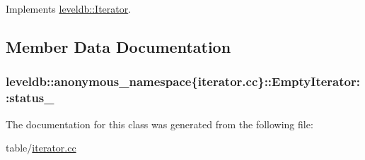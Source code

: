 Implements \hyperlink{classleveldb_1_1_iterator_a613ac2e965518aad7a064c64c72bcf7c}{leveldb\+::\+Iterator}.



\subsection{Member Data Documentation}
\hypertarget{classleveldb_1_1anonymous__namespace_02iterator_8cc_03_1_1_empty_iterator_ab74718f61154561ae3a8490d05f4da20}{}
\subsubsection[{status\+\_\+}]{ leveldb\+::anonymous\+\_\+namespace\{iterator.\+cc\}\+::Empty\+Iterator\+::status\+\_\+\hspace{0.3cm}{\ttfamily [private]}}\label{classleveldb_1_1anonymous__namespace_02iterator_8cc_03_1_1_empty_iterator_ab74718f61154561ae3a8490d05f4da20}


The documentation for this class was generated from the following file\+:\begin{DoxyCompactItemize}
\item 
table/\hyperlink{iterator_8cc}{iterator.\+cc}\end{DoxyCompactItemize}
